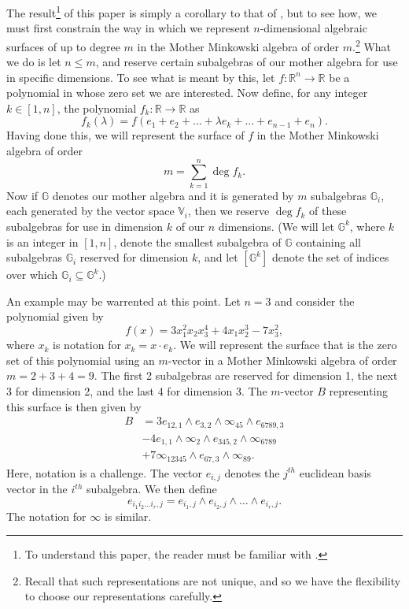 \documentclass{birkjour}
\theoremstyle{definition}
\theoremstyle{remark}
\numberwithin{equation}{section}
\newcommand{\R}{\mathbb{R}}
\newcommand{\G}{\mathbb{G}}
\newcommand{\V}{\mathbb{V}}
\newcommand{\nvai}{\infty}
\begin{document}
The result\footnote{To understand this paper, the reader must be familiar
with \cite{Parkin13}.} of this paper is simply a corollary to that of \cite{Parkin13}, but to see how,
we must first constrain the way in which we represent $n$-dimensional algebraic surfaces of up to degree $m$
in the Mother Minkowski algebra of order $m$.\footnote{Recall that such representations are not unique, and so
we have the flexibility to choose our representations carefully.} What we do is let $n\leq m$, and
reserve certain subalgebras of our mother algebra for use in specific dimensions.
To see what is meant by this, let $f:\R^n\to\R$ be a polynomial in whose zero set
we are interested.  Now define, for any integer $k\in[1,n]$, the polynomial $f_k:\R\to\R$ as
\begin{equation*}
f_k(\lambda)=f(e_1+e_2+\dots+\lambda e_k+\dots +e_{n-1}+e_n).
\end{equation*}
Having done this, we will represent the
surface of $f$ in the Mother Minkowski algebra of order
\begin{equation*}
m=\sum_{k=1}^n\deg f_k.
\end{equation*}
Now if $\G$ denotes our mother algebra and it is generated by $m$ subalgebras $\G_i$,
each generated by the vector space $\V_i$, then we reserve $\deg f_k$
of these subalgebras for use in dimension $k$ of our $n$ dimensions.
(We will let $\G^k$, where $k$ is an integer in $[1,n]$, denote the smallest
subalgebra of $\G$ containing all subalgebras $\G_i$ reserved for dimension $k$,
and let $[\G^k]$ denote the set of indices over which $\G_i\subseteq\G^k$.)

An example may be warrented at this point.  Let $n=3$ and consider the
polynomial given by
\begin{equation}\label{equ_example_poly}
f(x) = 3x_1^2x_2x_3^4 + 4x_1x_2^3 - 7x_3^2,
\end{equation}
where $x_k$ is notation for $x_k=x\cdot e_k$.  We will represent the
surface that is the zero set of this polynomial using an $m$-vector
in a Mother Minkowski algebra of order $m=2+3+4=9$.  The first
2 subalgebras are reserved for dimension 1, the next 3 for dimension
2, and the last 4 for dimension 3.  The $m$-vector $B$
representing this surface is then given by
\begin{align}
B &= 3e_{12,1}\wedge e_{3,2}\wedge \nvai_{45} \wedge e_{6789,3}\nonumber \\
 &- 4e_{1,1}\wedge\nvai_2\wedge e_{345,2}\wedge\nvai_{6789}\nonumber \\
 &+7\nvai_{12345}\wedge e_{67,3}\wedge\nvai_{89}.\label{equ_B_example}
\end{align}
Here, notation is a challenge.  The vector $e_{i,j}$ denotes the $j^{th}$ euclidean basis vector
in the $i^{th}$ subalgebra.  We then define
\begin{equation*}
e_{i_1i_2\dots i_r,j} = e_{i_1,j}\wedge e_{i_2,j}\wedge\dots\wedge e_{i_r,j}.
\end{equation*}
The notation for $\nvai$ is similar.
\end{document}
